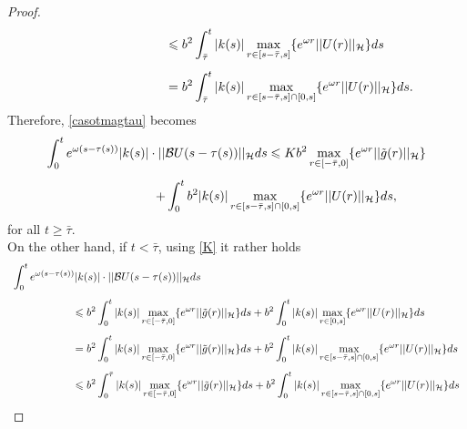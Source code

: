 \documentclass[11pt]{article}
\renewcommand{\geq}{\geqslant}
\renewcommand{\leq}{\leqslant}
\begin{document}
\begin{proof}
$$\begin{array}{l}
	\vspace{0.3cm}\displaystyle{\hspace{3cm}\leq b^2 \int_{\bar{\tau}}^t|k(s)|\max_{r\in[s-\bar{\tau},s]}\{e^{\omega r}||U(r)||_{\mathcal H}\} ds}\\
	\displaystyle{\hspace{3cm}= b^2\int_{\bar{\tau}}^t|k(s)|\max_{r\in[s-\bar{\tau},s]\cap[0,s]}\{e^{\omega r}||U(r)||_{\mathcal H}\} ds.}
\end{array}$$
Therefore, \eqref{casotmagtau} becomes 
\begin{equation}\label{casotmagtau2}
	\begin{array}{l}
		\vspace{0.3cm}\displaystyle{\int_0^t e^{\omega (s-\tau(s))} |k(s)|\cdot ||\mathcal{B}U(s-\tau(s))||_{\mathcal H}ds\leq Kb^2\max_{r\in[-\bar{\tau},0]}\{e^{\omega r}||\tilde{g}(r)||_{\mathcal H}\}}\\
		\displaystyle{\hspace{3cm}+\int_{0}^{t}b^2|k(s)|\max_{r\in[s-\bar{\tau},s]\cap[0,s]}\{e^{\omega r}||U(r)||_{\mathcal H}\} ds,}
	\end{array}
\end{equation}
for all $t\geq \bar{\tau}$.
\\On the other hand, if $t<\bar{\tau}$, using \eqref{K} it rather holds
$$\begin{array}{l}
	\vspace{0.3cm}\displaystyle{\int_0^{t} e^{\omega (s-\tau(s))} |k(s)|\cdot ||\mathcal{B}U(s-\tau(s))||_{\mathcal H}ds}\\
	\vspace{0.3cm}\displaystyle{\hspace{2cm}\leq b^2\int_0^t |k(s)| \max_{r\in[-\bar{\tau},0]}\{e^{\omega r}||\tilde{g}(r)||_{\mathcal H}\}ds+b^2\int_{0}^{t}|k(s)|\max_{r\in[0,s]}\{e^{\omega r}||U(r)||_{\mathcal H}\} ds}\\
	\vspace{0.3cm}
	\displaystyle{\hspace{2cm}= b^2\int_0^t |k(s)| \max_{r\in[-\bar{\tau},0]}\{e^{\omega r}||\tilde{g}(r)||_{\mathcal H}\}ds+b^2\int_{0}^{t}|k(s)|\max_{r\in[s-\bar{\tau},s]\cap[0,s]}\{e^{\omega r}||U(r)||_{\mathcal H}\} ds}\\
	\displaystyle{\hspace{2cm}\leq b^2\int_0^{\bar{\tau}} |k(s)| \max_{r\in[-\bar{\tau},0]}\{e^{\omega r}||\tilde{g}(r)||_{\mathcal H}\}ds+b^2\int_{0}^{t}|k(s)|\max_{r\in[s-\bar{\tau},s]\cap[0,s]}\{e^{\omega r}||U(r)||_{\mathcal H}\} ds}\\

\end{array}$$
\end{proof}
\end{document}
